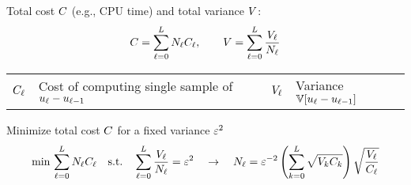 \begin{frame}{\name{}}
    \begin{squarelist}
        \item<1-> Total cost $C$ (e.g., CPU time) and total variance $V$:
        \begin{equation*}
            C = \sum_{\ell = 0}^L N_\ell C_\ell, \qquad V = \sum_{\ell = 0}^L\frac{V_\ell}{N_\ell}
        \end{equation*}
        \vspace{-1.5em}
        \begin{block}{}
            \begin{centering}
                \begin{tabular}{r|lcr|l}
                    $C_\ell$ & Cost of computing single sample of $u_\ell - u_{\ell-1}$ & &
                    $V_\ell$ & Variance $\mathbb{V}[u_\ell - u_{\ell-1}]$
                \end{tabular}
            \end{centering}
        \end{block}
        \vspace{0.5em}
        \item<2-> Minimize total cost $C$ for a fixed variance $\varepsilon^2$
            \begin{equation*}
                \min\, \sum_{\ell = 0}^L N_\ell C_\ell \quad \text{s.t.} \quad \sum_{\ell = 0}^L\frac{V_\ell}{N_\ell} = \varepsilon^2 \quad \rightarrow \quad N_\ell = \varepsilon^{-2}\left(\sum_{k = 0}^L \sqrt{V_k C_k}\right)\sqrt{\frac{V_\ell}{C_\ell}}
            \end{equation*}
    \end{squarelist}
\end{frame}


